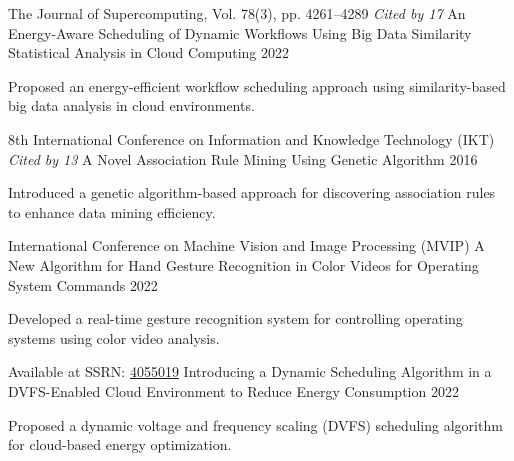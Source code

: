 
\begin{cventries}

  \cventry
    {The Journal of Supercomputing, Vol. 78(3), pp. 4261–4289 \hspace{1em} \textit{Cited by 17}} %
    {An Energy-Aware Scheduling of Dynamic Workflows Using Big Data Similarity Statistical Analysis in Cloud Computing}
    {2022}
    {}
    {
      \begin{cvitems}
        \item {\small Proposed an energy-efficient workflow scheduling approach using similarity-based big data analysis in cloud environments.}
      \end{cvitems}
    }

  \cventry
    {8th International Conference on Information and Knowledge Technology (IKT) \hspace{1em} \textit{Cited by 13}} 
    {A Novel Association Rule Mining Using Genetic Algorithm}
    {2016}
    {}
    {
      \begin{cvitems}
        \item {\small Introduced a genetic algorithm-based approach for discovering association rules to enhance data mining efficiency.}
      \end{cvitems}
    }

  \cventry
    {International Conference on Machine Vision and Image Processing (MVIP)} 
    {A New Algorithm for Hand Gesture Recognition in Color Videos for Operating System Commands}
    {2022}
    {}
    {
      \begin{cvitems}
        \item {\small Developed a real-time gesture recognition system for controlling operating systems using color video analysis.}
      \end{cvitems}
    }

  \cventry
    {Available at SSRN: \href{https://ssrn.com/abstract=4055019}{4055019}} 
    {Introducing a Dynamic Scheduling Algorithm in a DVFS-Enabled Cloud Environment to Reduce Energy Consumption}
    {2022}
    {}
    {
      \begin{cvitems}
        \item {\small Proposed a dynamic voltage and frequency scaling (DVFS) scheduling algorithm for cloud-based energy optimization.}
      \end{cvitems}
    }

\end{cventries}
